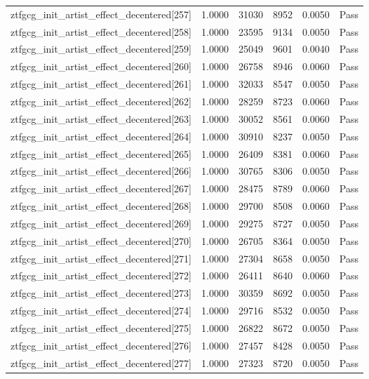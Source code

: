 \begin{table}[htbp]
\begin{tabular}{llrrll}
ztfgcg\_init\_artist\_effect\_decentered[257] & 1.0000 & 31030 & 8952 & 0.0050 & Pass \\
ztfgcg\_init\_artist\_effect\_decentered[258] & 1.0000 & 23595 & 9134 & 0.0050 & Pass \\
ztfgcg\_init\_artist\_effect\_decentered[259] & 1.0000 & 25049 & 9601 & 0.0040 & Pass \\
ztfgcg\_init\_artist\_effect\_decentered[260] & 1.0000 & 26758 & 8946 & 0.0060 & Pass \\
ztfgcg\_init\_artist\_effect\_decentered[261] & 1.0000 & 32033 & 8547 & 0.0050 & Pass \\
ztfgcg\_init\_artist\_effect\_decentered[262] & 1.0000 & 28259 & 8723 & 0.0060 & Pass \\
ztfgcg\_init\_artist\_effect\_decentered[263] & 1.0000 & 30052 & 8561 & 0.0060 & Pass \\
ztfgcg\_init\_artist\_effect\_decentered[264] & 1.0000 & 30910 & 8237 & 0.0050 & Pass \\
ztfgcg\_init\_artist\_effect\_decentered[265] & 1.0000 & 26409 & 8381 & 0.0060 & Pass \\
ztfgcg\_init\_artist\_effect\_decentered[266] & 1.0000 & 30765 & 8306 & 0.0050 & Pass \\
ztfgcg\_init\_artist\_effect\_decentered[267] & 1.0000 & 28475 & 8789 & 0.0060 & Pass \\
ztfgcg\_init\_artist\_effect\_decentered[268] & 1.0000 & 29700 & 8508 & 0.0060 & Pass \\
ztfgcg\_init\_artist\_effect\_decentered[269] & 1.0000 & 29275 & 8727 & 0.0050 & Pass \\
ztfgcg\_init\_artist\_effect\_decentered[270] & 1.0000 & 26705 & 8364 & 0.0050 & Pass \\
ztfgcg\_init\_artist\_effect\_decentered[271] & 1.0000 & 27304 & 8658 & 0.0050 & Pass \\
ztfgcg\_init\_artist\_effect\_decentered[272] & 1.0000 & 26411 & 8640 & 0.0060 & Pass \\
ztfgcg\_init\_artist\_effect\_decentered[273] & 1.0000 & 30359 & 8692 & 0.0050 & Pass \\
ztfgcg\_init\_artist\_effect\_decentered[274] & 1.0000 & 29716 & 8532 & 0.0050 & Pass \\
ztfgcg\_init\_artist\_effect\_decentered[275] & 1.0000 & 26822 & 8672 & 0.0050 & Pass \\
ztfgcg\_init\_artist\_effect\_decentered[276] & 1.0000 & 27457 & 8428 & 0.0050 & Pass \\
ztfgcg\_init\_artist\_effect\_decentered[277] & 1.0000 & 27323 & 8720 & 0.0050 & Pass \\

\end{tabular}
\end{table}
